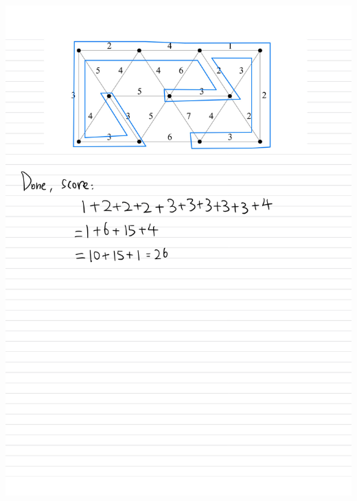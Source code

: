\documentclass[]{article}
\theoremstyle{definition}
\begin{document}
    \begin{center}
        \includegraphics[width=14cm]{HW1-11.jpg}
    \end{center}
\end{document}

